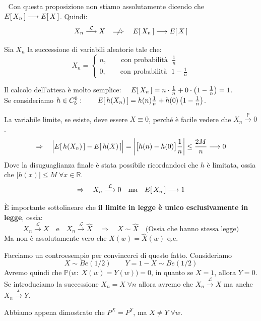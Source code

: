 \bigskip
\noindent \faWarning $\;$ Con questa proposizione non stiamo assolutamente dicendo che $E\!\left[\,X_n\,\right]\longrightarrow E\!\left[\,X\,\right]$. Quindi:
\[X_n\overset{\mathcal{L}}{\longrightarrow} X \quad \;\not\!\!\!\Longrightarrow\quad E\!\left[\,X_n\,\right]\longrightarrow E\!\left[\,X\,\right]\]
\begin{esempio}
    Sia $X_n$ la successione di variabili aleatorie tale che:
    \[X_n = \begin{cases}
        n, \qquad \text{con probabilità } \;\frac{1}{n}\\
        0, \qquad \text{con probabilità } \;1-\frac{1}{n}
    \end{cases}\]

    Il calcolo dell'attesa è molto semplice: \(\quad E\!\left[\,X_n\,\right] = n\cdot \frac1n + 0\cdot \left(1-\frac1n\right) = 1\).\\
    Se consideriamo $h\in C^0_b:\qquad E\!\left[\,h(X_n)\,\right] = h(n)\frac1n + h(0)\left(1-\frac1n\right)$.

    \medskip
    La variabile limite, se esiste, deve essere $X\equiv0$, perché è facile vedere che $X_n\overset{\mathbb{P}}{\longrightarrow} 0$. 
    \[\Rightarrow\quad \Bigl|E\!\left[\,h(X_n)\,\right] - E\!\left[\,h(X)\,\right]\Bigr| = \left|\bigl[h(n) - h(0)\bigr]\frac1n\right|\leq \frac{2M}n \longrightarrow 0\]
    Dove la disuguaglianza finale è stata possibile ricordandoci che $h$ è limitata, ossia che $|h(x)|\leq M\;\forall x\in\mathbb{R}$.
    \[\Rightarrow\quad X_n\overset{\mathcal{L}}{\longrightarrow} 0\quad \text{ma} \quad E\!\left[\,X_n\,\right] \longrightarrow 1\]
\end{esempio}

\bigskip
\noindent È importante sottolineare che \textbf{il limite in legge è unico esclusivamente in legge}, ossia:
\[X_n\overset{\mathcal{L}}{\longrightarrow} X \quad \text{e} \quad X_n\overset{\mathcal{L}}{\longrightarrow} \widehat{X} \quad \Rightarrow\quad X \sim \widehat{X}\quad \text{(Ossia che hanno stessa legge)}\]
Ma non è assolutamente vero che $X(w) = \widehat{X}(w)$ q.c.

\bigskip
\begin{esempio}
    Facciamo un controesempio per convincerci di questo fatto. Consideriamo
    \[X\sim Be(1/2)\qquad Y = 1 -X \sim Be(1/2)\]
    Avremo quindi che $\mathbb{P}\bigl(w:\;X(w) = Y(w)\bigr) = 0$, in quanto se $X=1$, allora $Y=0$. Se introduciamo la successione $X_n = X \;\forall n$ allora avremo che $X_n \overset{\mathcal{L}}{\longrightarrow}X$ ma anche $X_n \overset{\mathcal{L}}{\longrightarrow}Y$.

    \medskip
    Abbiamo appena dimostrato che $P^X = P^Y$, ma $X\neq Y\;\forall w$.
\end{esempio}

